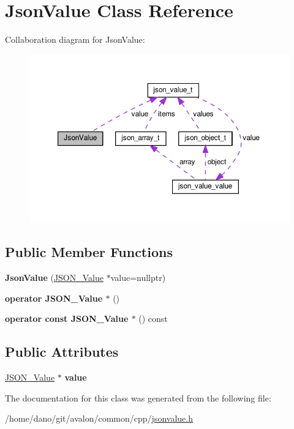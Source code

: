 \hypertarget{classJsonValue}{}\section{Json\+Value Class Reference}
\label{classJsonValue}


Collaboration diagram for Json\+Value\+:
\nopagebreak
\begin{figure}[H]
\begin{center}
\leavevmode
\includegraphics[width=350pt]{classJsonValue__coll__graph}
\end{center}
\end{figure}
\subsection*{Public Member Functions}
\begin{DoxyCompactItemize}
\item 
\mbox{\label{classJsonValue_ab3472bb5f46ffe09917e525d97bd6032}} 
{\bfseries Json\+Value} (\hyperlink{structjson__value__t}{J\+S\+O\+N\+\_\+\+Value} $\ast$value=nullptr)
\item 
\mbox{\label{classJsonValue_a6b4417646e1f2eabc2967c2188f358ec}} 
{\bfseries operator J\+S\+O\+N\+\_\+\+Value $\ast$} ()
\item 
\mbox{\label{classJsonValue_a0bfcad4665d147fd334164a853a28cab}} 
{\bfseries operator const J\+S\+O\+N\+\_\+\+Value $\ast$} () const
\end{DoxyCompactItemize}
\subsection*{Public Attributes}
\begin{DoxyCompactItemize}
\item 
\mbox{\label{classJsonValue_a66d06504dcaae98021133c627facca9f}} 
\hyperlink{structjson__value__t}{J\+S\+O\+N\+\_\+\+Value} $\ast$ {\bfseries value}
\end{DoxyCompactItemize}


The documentation for this class was generated from the following file\+:\begin{DoxyCompactItemize}
\item 
/home/dano/git/avalon/common/cpp/\hyperlink{jsonvalue_8h}{jsonvalue.\+h}\end{DoxyCompactItemize}
